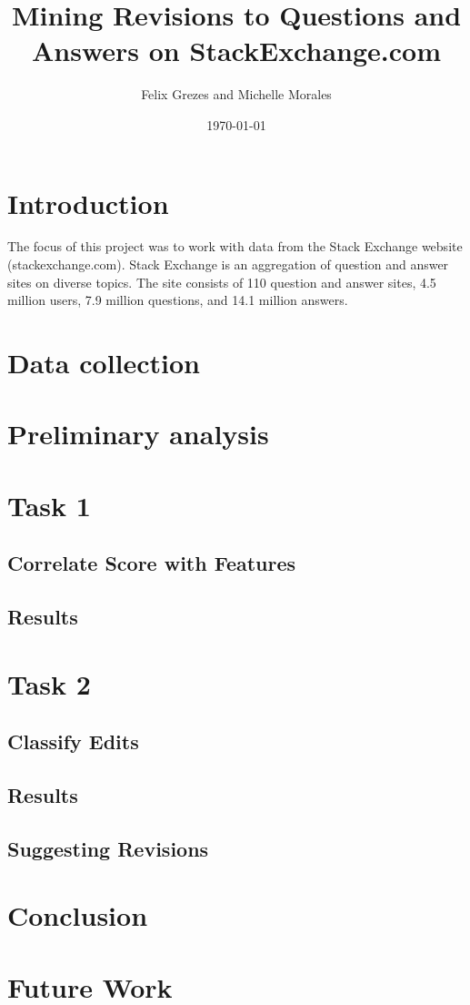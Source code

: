 \documentclass[11pt, oneside]{article}   	%
\title{Mining Revisions to Questions and Answers on StackExchange.com}
\author{Felix Grezes and Michelle Morales}
\date{\today}							%
\begin{document}
\maketitle

\section{Introduction}
The focus of this project was to work with data from the Stack Exchange website (stackexchange.com). Stack Exchange is an aggregation of question and answer sites on diverse topics. The site consists of 110 question and answer sites, 4.5 million users, 7.9 million questions, and 14.1 million answers. 
\section{Data collection}

\section{Preliminary analysis}

\section{Task 1}
\subsection{Correlate Score with Features}
\subsection{Results}

\section{Task 2}
\subsection{Classify Edits}
\subsection{Results}
\subsection{Suggesting Revisions}

\section{Conclusion}
\section{Future Work}
\end{document}
